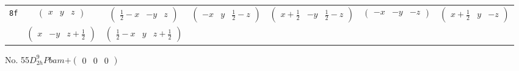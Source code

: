 \documentclass[fleqn,9pt,landscape]{jsarticle}
\begin{document}
\begin{center}
\begin{longtable}{ccccccc}
{\tt 8f} & $ \begin{pmatrix} x & y & z \end{pmatrix} $ & $ \begin{pmatrix} \frac{1}{2} - x & - y & z \end{pmatrix} $ & $ \begin{pmatrix} - x & y & \frac{1}{2} - z \end{pmatrix} $ & $ \begin{pmatrix} x + \frac{1}{2} & - y & \frac{1}{2} - z \end{pmatrix} $ & $ \begin{pmatrix} - x & - y & - z \end{pmatrix} $ & $ \begin{pmatrix} x + \frac{1}{2} & y & - z \end{pmatrix} $ \\
& $ \begin{pmatrix} x & - y & z + \frac{1}{2} \end{pmatrix} $ & $ \begin{pmatrix} \frac{1}{2} - x & y & z + \frac{1}{2} \end{pmatrix} $ & $  $ & $  $ & $  $ & $  $ \\
\end{longtable}
\end{center}
\newpage
No. 55\quad$D_{2h}^{9}$\quad$Pbam$\quad[ orthorhombic ]\quad$+\begin{pmatrix} 0 & 0 & 0 \end{pmatrix}$
\end{document}
